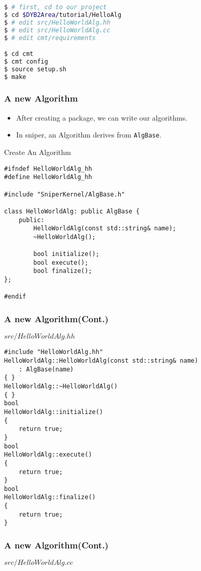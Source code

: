 \newsavebox{\createalg}
\begin{lrbox}{\createalg}
\begin{lstlisting}[language=bash]
$ # first, cd to our project
$ cd $DYB2Area/tutorial/HelloAlg
$ # edit src/HelloWorldAlg.hh
$ # edit src/HelloWorldAlg.cc
$ # edit cmt/requirements

$ cd cmt
$ cmt config
$ source setup.sh
$ make
\end{lstlisting}
\end{lrbox}

\begin{frame}
    \frametitle{A new Algorithm}
    \begin{itemize}
        \item After creating a package, we can write our algorithms.
        \item In sniper, an Algorithm derives from {\tt AlgBase}.
    \end{itemize}
    \begin{block}{Create An Algorithm}
        \par\usebox{\createalg}
    \end{block}
\end{frame}

\newsavebox{\createalgheader}
\begin{lrbox}{\createalgheader}
\begin{lstlisting}
#ifndef HelloWorldAlg_hh
#define HelloWorldAlg_hh

#include "SniperKernel/AlgBase.h"

class HelloWorldAlg: public AlgBase {
    public:
        HelloWorldAlg(const std::string& name);
        ~HelloWorldAlg();

        bool initialize();
        bool execute();
        bool finalize();
};

#endif
\end{lstlisting}
\end{lrbox}

\begin{frame}
    \frametitle{A new Algorithm(Cont.)}
    \begin{block}{\(src/HelloWorldAlg.hh\)}
        \par\usebox{\createalgheader}
    \end{block}
\end{frame}

\newsavebox{\createalgimpl}
\begin{lrbox}{\createalgimpl}
\begin{lstlisting}
#include "HelloWorldAlg.hh"
HelloWorldAlg::HelloWorldAlg(const std::string& name)
    : AlgBase(name)
{ }
HelloWorldAlg::~HelloWorldAlg()
{ }
bool
HelloWorldAlg::initialize()
{
    return true;
}
bool
HelloWorldAlg::execute()
{
    return true;
}
bool
HelloWorldAlg::finalize()
{
    return true;
}
\end{lstlisting}
\end{lrbox}

\begin{frame}
    \frametitle{A new Algorithm(Cont.)}
    \begin{block}{\(src/HelloWorldAlg.cc\)}
        \par\usebox{\createalgimpl}
    \end{block}
\end{frame}
